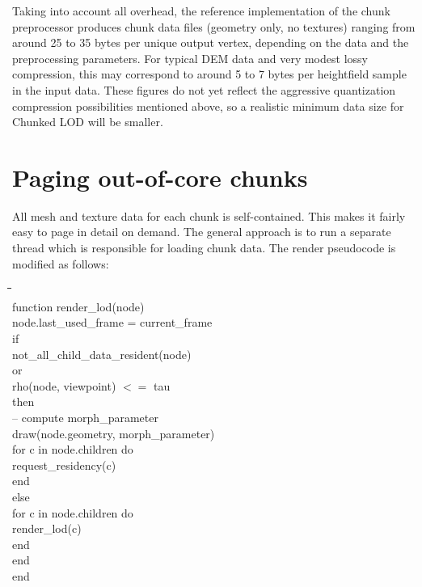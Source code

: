 \documentclass[12pt]{article}
\begin{document}

Taking into account all overhead, the reference implementation of the
chunk preprocessor produces chunk data files (geometry only, no
textures) ranging from around 25 to 35 bytes per unique output vertex,
depending on the data and the preprocessing parameters.  For typical
DEM data and very modest lossy compression, this may correspond to
around 5 to 7 bytes per heightfield sample in the input data.  These
figures do not yet reflect the aggressive quantization compression
possibilities mentioned above, so a realistic minimum data size for
Chunked LOD will be smaller.
 
\section{Paging out-of-core chunks}

All mesh and texture data for each chunk is self-contained.  This
makes it fairly easy to page in detail on demand.  The general
approach is to run a separate thread which is responsible for loading
chunk data.  The render pseudocode is modified as follows:

\begin{ttfamily}
\begin{tabbing}
\hspace{0.25in}\=\hspace{0.25in}\=\hspace{0.25in}\=\hspace{0.25in}\=\hspace{0.25in}\= \\
function render\_lod(node)							\\
\>	node.last\_used\_frame = current\_frame					\\
\>	if									\\
\>\>		not\_all\_child\_data\_resident(node)				\\
\>	or									\\
\>\>		rho(node, viewpoint) $<=$ tau			\\
\>	then									\\
\>\>		-- compute morph\_parameter					\\
\>\>		draw(node.geometry, morph\_parameter)				\\
\>\>		for c in node.children do					\\
\>\>\>			request\_residency(c)					\\
\>\>		end								\\
\>	else									\\
\>\>		for c in node.children do					\\
\>\>\>			render\_lod(c)						\\
\>\>		end								\\
\>	end									\\
end
\end{tabbing}
\end{ttfamily}
 
\end{document}
